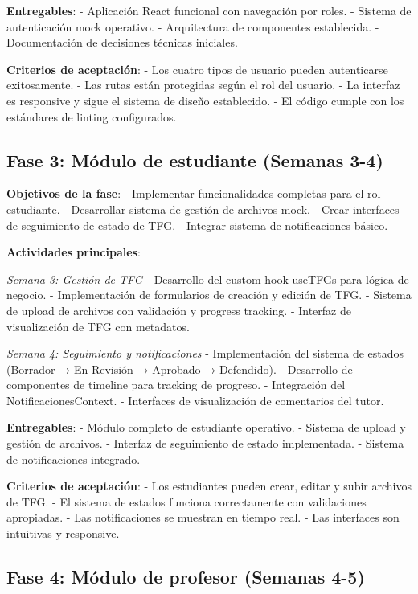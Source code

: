 \documentclass[12pt,a4paper,oneside]{report}
\begin{document}
\textbf{Entregables}: - Aplicación React funcional con navegación por
roles. - Sistema de autenticación mock operativo. - Arquitectura de
componentes establecida. - Documentación de decisiones técnicas
iniciales.

\textbf{Criterios de aceptación}: - Los cuatro tipos de usuario pueden
autenticarse exitosamente. - Las rutas están protegidas según el rol del
usuario. - La interfaz es responsive y sigue el sistema de diseño
establecido. - El código cumple con los estándares de linting
configurados.

\subsection{Fase 3: Módulo de estudiante (Semanas
3-4)}\label{fase-3-muxf3dulo-de-estudiante-semanas-3-4}

\textbf{Objetivos de la fase}: - Implementar funcionalidades completas
para el rol estudiante. - Desarrollar sistema de gestión de archivos
mock. - Crear interfaces de seguimiento de estado de TFG. - Integrar
sistema de notificaciones básico.

\textbf{Actividades principales}:

\emph{Semana 3: Gestión de TFG} - Desarrollo del custom hook useTFGs
para lógica de negocio. - Implementación de formularios de creación y
edición de TFG. - Sistema de upload de archivos con validación y
progress tracking. - Interfaz de visualización de TFG con metadatos.

\emph{Semana 4: Seguimiento y notificaciones} - Implementación del
sistema de estados (Borrador → En Revisión → Aprobado → Defendido). -
Desarrollo de componentes de timeline para tracking de progreso. -
Integración del NotificacionesContext. - Interfaces de visualización de
comentarios del tutor.

\textbf{Entregables}: - Módulo completo de estudiante operativo. -
Sistema de upload y gestión de archivos. - Interfaz de seguimiento de
estado implementada. - Sistema de notificaciones integrado.

\textbf{Criterios de aceptación}: - Los estudiantes pueden crear, editar
y subir archivos de TFG. - El sistema de estados funciona correctamente
con validaciones apropiadas. - Las notificaciones se muestran en tiempo
real. - Las interfaces son intuitivas y responsive.

\subsection{Fase 4: Módulo de profesor (Semanas
4-5)}\label{fase-4-muxf3dulo-de-profesor-semanas-4-5}
\end{document}
